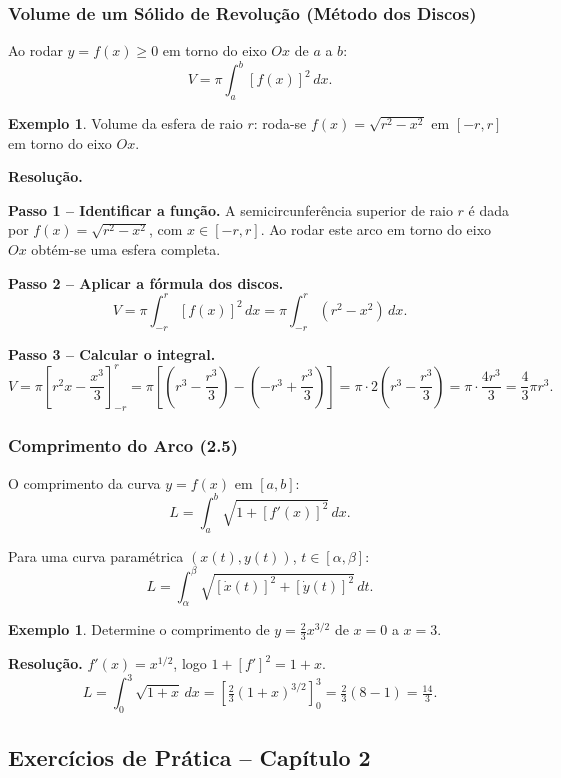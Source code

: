 \documentclass[12pt,a4paper]{article}
\theoremstyle{definition}
\newtheorem{example}[theorem]{Exemplo}
\theoremstyle{remark}
\begin{document}
\subsubsection*{Volume de um Sólido de Revolução (Método dos Discos)}

Ao rodar $y=f(x)\geq 0$ em torno do eixo $Ox$ de $a$ a $b$:
\[
  V = \pi\int_a^b [f(x)]^2\,dx.
\]

\begin{example}
  Volume da esfera de raio $r$: roda-se $f(x)=\sqrt{r^2-x^2}$ em
  $[-r,r]$ em torno do eixo $Ox$.

  \textbf{Resolução.}

  \textbf{Passo 1 -- Identificar a função.} A semicircunferência superior de
  raio $r$ é dada por $f(x)=\sqrt{r^2-x^2}$, com $x\in[-r,r]$. Ao rodar
  este arco em torno do eixo $Ox$ obtém-se uma esfera completa.

  \textbf{Passo 2 -- Aplicar a fórmula dos discos.}
  \[
    V = \pi\int_{-r}^r [f(x)]^2\,dx = \pi\int_{-r}^r (r^2-x^2)\,dx.
  \]

  \textbf{Passo 3 -- Calcular o integral.}
  \[
    V = \pi\left[r^2 x - \frac{x^3}{3}\right]_{-r}^r
      = \pi\left[\left(r^3-\frac{r^3}{3}\right)-\left(-r^3+\frac{r^3}{3}\right)\right]
      = \pi\cdot 2\left(r^3-\frac{r^3}{3}\right)
      = \pi\cdot\frac{4r^3}{3} = \frac{4}{3}\pi r^3.
  \]
\end{example}

\subsubsection*{Comprimento do Arco (2.5)}

O comprimento da curva $y=f(x)$ em $[a,b]$:
\[
  L = \int_a^b \sqrt{1+[f'(x)]^2}\,dx.
\]

Para uma curva paramétrica $(x(t),y(t))$, $t\in[\alpha,\beta]$:
\[
  L = \int_\alpha^\beta \sqrt{[\dot x(t)]^2+[\dot y(t)]^2}\,dt.
\]

\begin{example}
  Determine o comprimento de $y=\frac{2}{3}x^{3/2}$ de $x=0$ a $x=3$.

  \textbf{Resolução.} $f'(x)=x^{1/2}$, logo $1+[f']^2=1+x$.
  \[
    L = \int_0^3\sqrt{1+x}\,dx = \left[\tfrac{2}{3}(1+x)^{3/2}\right]_0^3
      = \tfrac{2}{3}(8-1) = \tfrac{14}{3}.
  \]
\end{example}

\subsection{Exercícios de Prática -- Capítulo 2}
\end{document}
